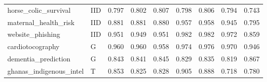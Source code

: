 \begin{longtable}{@{}p{3.95cm}lrrrrrrr@{}}
horse\_\allowbreak{}colic\_\allowbreak{}survival & IID & 0.797 & 0.802 & 0.807 & 0.798 & 0.806 & 0.794 & 0.743\\
maternal\_\allowbreak{}health\_\allowbreak{}risk & IID & 0.881 & 0.881 & 0.880 & 0.957 & 0.958 & 0.945 & 0.795\\
website\_\allowbreak{}phishing & IID & 0.951 & 0.949 & 0.951 & 0.982 & 0.982 & 0.972 & 0.859\\
cardiotocography & G & 0.960 & 0.960 & 0.958 & 0.974 & 0.976 & 0.970 & 0.946\\
dementia\_\allowbreak{}prediction & G & 0.843 & 0.841 & 0.845 & 0.829 & 0.835 & 0.819 & 0.867\\
ghanas\_\allowbreak{}indigenous\_\allowbreak{}intel & T & 0.853 & 0.825 & 0.828 & 0.905 & 0.888 & 0.718 & 0.780\\
\end{longtable}\endgroup
